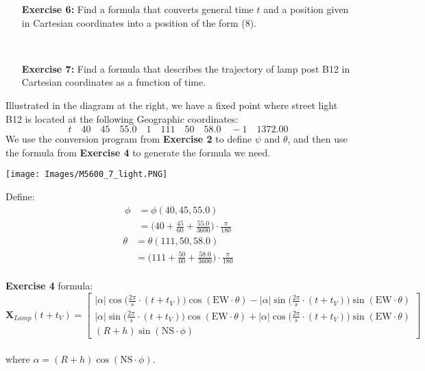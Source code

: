 \documentclass[11pt]{article}
\theoremstyle{definition}
\newcommand{\1}[1]{\mathbf{1} \left \{ #1 \right \}}
\begin{document}
\begin{itemize}
\item[{\textbf{Exercise 6:}}] Find a formula that converts general time $t$ and a position given in Cartesian coordinates into a position of the form (8).
\end{itemize}
\\
\begin{itemize}
\item[{\textbf{Exercise 7:}}] Find a formula that describes the trajectory of lamp post B12 in Cartesian coordinates as a function of time.
\end{itemize}
\begin{minipage}{0.6\linewidth}
Illustrated in the diagram at the right, we have a fixed point where street light B12 is located at the following Geographic coordinates:
\[t \quad 40 \quad 45 \quad 55.0 \quad 1 \quad 111 \quad 50 \quad 58.0 \quad -1 \quad 1372.00\]
We use the conversion program from \textbf{Exercise 2} to define $\psi$ and $\theta$, and then use the formula from \textbf{Exercise 4} to generate the formula we need.
\end{minipage} \qquad
\begin{minipage}{0.4\linewidth}
\texttt{[image: Images/M5600\_7\_light.PNG]}
\end{minipage}
Define:
\begin{align*}
    \phi &= \phi(40, 45, 55.0) \\
    &= \bigg(40 + \frac{45}{60} + \frac{55.0}{3600}\bigg) \cdot \frac{\pi}{180}
\end{align*}
\begin{align*}
    \theta &= \theta(111, 50, 58.0) \\
    &= \bigg(111 + \frac{50}{60} + \frac{58.0}{3600}\bigg) \cdot \frac{\pi}{180}
\end{align*}
\\
\textbf{Exercise 4} formula:
\[\textbf{X}_{Lamp}(t+t_V) = \begin{bmatrix}
|\alpha| \cos \big(\frac{2\pi}{s} \cdot (t+t_V) \big) \cos (\textrm{EW} \cdot \theta) - |\alpha| \sin \big(\frac{2\pi}{s} \cdot (t+t_V) \big) \sin (\textrm{EW} \cdot \theta) \\
|\alpha| \sin \big(\frac{2\pi}{s} \cdot (t+t_V) \big) \cos (\textrm{EW} \cdot \theta) + |\alpha| \cos \big(\frac{2\pi}{s} \cdot (t+t_V) \big) \sin (\textrm{EW} \cdot \theta) \\
(R + h) \sin (\textrm{NS} \cdot \phi)
\end{bmatrix}\] \\
where \(\alpha = (R + h) \cos (\textrm{NS} \cdot \phi)\).
\end{document}
